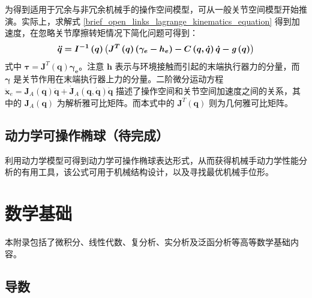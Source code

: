 \documentclass[cn,11pt,chinese,blue,bibstyle=ieeetr]{elegantbook}
\begin{document}
{为得到适用于冗余与非冗余机械手的操作空间模型，可从一般关节空间模型开始推演。实际上，求解式 \ref{brief_open_links_lagrange_kinematics_equation} 得到加速度，在忽略关节摩擦转矩情况下简化问题可得到：
\begin{equation}
\bm{\ddot{q} = \bm{I}^{-1}\left(q\right) \left(J^T\left(q\right)\left(\gamma_e - h_e\right) - C\left(q, \dot{q}\right)\dot{q} - \textbf{\textit{g}}\left(q\right)\right)}
\end{equation}
式中 $\bm{\tau} = \bm{J}^T\left(\bm{q}\right)\bm{\gamma_e}$。注意 $\bm{h}$ 表示与环境接触而引起的末端执行器力的分量，而 $\bm{\gamma}$ 是关节作用在末端执行器上力的分量。二阶微分运动方程 $\ddot{\bm{x}}_e = \bm{J}_A\left(\bm{q}\right)\bm{\ddot{q}} + \bm{\dot{J}}_A\left(\bm{q},\bm{\dot{q}}\right)\bm{\dot{q}}$ 描述了操作空间和关节空间加速度之间的关系，其中的 $\bm{J}_A\left(\bm{q}\right)$ 为解析雅可比矩阵。而本式中的 $\bm{J}^T\left(\bm{q}\right)$ 则为几何雅可比矩阵。



\section{动力学可操作椭球（待完成）}

利用动力学模型可得到动力学可操作椭球表达形式，从而获得机械手动力学性能分析的有用工具，该公式可用于机械结构设计，以及寻找最优机械手位形。


\nocite{*} 





\appendix

\chapter{数学基础}


本附录包括了微积分、线性代数、复分析、实分析及泛函分析等高等数学基础内容。

\section{导数}

\usetikzlibrary{arrows,intersections}

}
\end{document}
